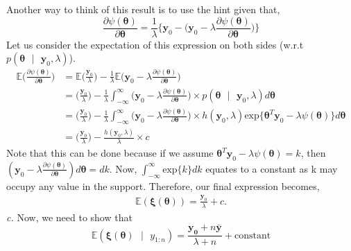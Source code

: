 \documentclass[11pt]{article}
\begin{document}
Another way to think of this result is to use the hint given that,
\begin{equation}
  \nonumber
  \frac{\partial \psi(\bm{\theta})}{\partial \bm{\theta}} = \frac{1}{\lambda}\bigg\{\mathbf{y}_{0} - \bigg(\mathbf{y}_{0} - \lambda\frac{\partial \psi(\bm{\theta})}{\partial \bm{\theta}} \bigg)\bigg\}
\end{equation}
Let us consider the expectation of this expression on both sides (w.r.t $p(\bm{\theta} \text{ }|\text{ } \mathbf{y}_{0}, \lambda)$).
\begin{equation}
  \nonumber
  \begin{aligned}
    \mathbb{E}\bigg(\frac{\partial \psi(\bm{\theta})}{\partial \bm{\theta}}\bigg) & = \mathbb{E}\bigg(\frac{\mathbf{y}_{0}}{\lambda}\bigg) - \frac{1}{\lambda}\mathbb{E}\bigg(\mathbf{y}_{0} - \lambda \frac{\partial \psi(\bm{\theta})}{\partial \bm{\theta}} \bigg)\\
    & = \bigg(\frac{\mathbf{y}_{0}}{\lambda}\bigg) - \frac{1}{\lambda} \int_{-\infty}^{\infty} \bigg(\mathbf{y}_{0} - \lambda \frac{\partial \psi(\bm{\theta})}{\partial \bm{\theta}} \bigg)\times p(\bm{\theta} \text{ }|\text{ } \mathbf{y}_{0}, \lambda) d \bm{\theta}\\
    & = \bigg(\frac{\mathbf{y}_{0}}{\lambda}\bigg) - \frac{1}{\lambda} \int_{-\infty}^{\infty} \bigg(\mathbf{y}_{0} - \lambda \frac{\partial \psi(\bm{\theta})}{\partial \bm{\theta}} \bigg)\times h(\mathbf{y}_{0}, \lambda)\text{exp}\{\bm{\theta}^{T}\mathbf{y}_{0} - \lambda \psi(\bm{\theta})\} d \bm{\theta}\\
    & = \bigg(\frac{\mathbf{y}_{0}}{\lambda}\bigg) - \frac{h(\mathbf{y}_{0}, \lambda)}{\lambda} \times c
  \end{aligned}
\end{equation}
Note that this can be done because if we assume $\bm{\theta}^{T}\mathbf{y}_{0} - \lambda \psi(\bm{\theta}) = k$, then $(\mathbf{y}_{0} - \lambda \frac{\partial \psi(\bm{\theta})}{\partial \bm{\theta}}) d \bm{\theta} = dk$. Now, $\int_{-\infty}^{\infty} \text{exp}\{k\} dk$ equates to a constant as k  may occupy any value in the support. Therefore, our final expression becomes,
\begin{equation}
  \nonumber
  \begin{aligned}
    \mathbb{E}(\bm{\xi}({\bm{\theta}})) = \frac{\mathbf{y}_{0}}{\lambda} + c.
  \end{aligned}
\end{equation}
\emph{c.} Now, we need to show that
\begin{equation}
  \nonumber
  \mathbb{E}(\bm{\xi}(\bm{\theta}) \text{ }|\text{ } y_{1:n}) = \frac{\mathbf{y_{0}} + n\bar{\mathbf{y}}}{\lambda + n} + \text{constant}
\end{equation}
\end{document}
